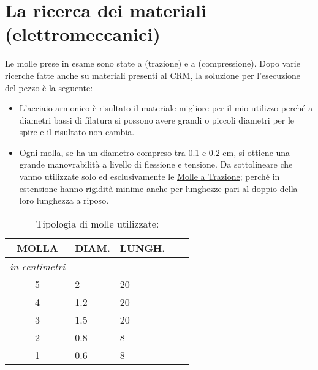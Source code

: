 
\chapter{La ricerca dei materiali (elettromeccanici)}
\label{chp:La ricerca dei materiali (elettromeccanici)}

Le molle prese in esame sono state a (trazione) e a (compressione).
Dopo varie ricerche fatte anche su materiali presenti al CRM, la soluzione per l'esecuzione del pezzo è la seguente:

\begin{itemize}
\item{L'acciaio armonico è risultato il materiale migliore per il mio utilizzo perché a diametri bassi di filatura si possono avere grandi o piccoli diametri per le spire e il risultato non cambia.}
\item{Ogni molla, se ha un diametro compreso tra 0.1 e 0.2 cm, si ottiene una grande manovrabilità a livello di flessione e tensione. Da sottolineare che vanno utilizzate solo ed esclusivamente le \underline {Molle a Trazione}; perché in estensione hanno rigidità minime anche per lunghezze pari al doppio della loro lunghezza a riposo.}
\end{itemize}

\begin{table}[htp]
\caption{Tipologia di molle utilizzate:}
\begin{center}

\begin{tabular}{cp{2cm}p{2cm}p{.2cm}p{2cm}} \textbf{MOLLA}&\textbf{DIAM.}&\textbf{LUNGH.}\\
\hline \textit{in centimetri} \\
\hline 5&2&20\\
\hline 4&1.2&20\\
\hline 3&1.5&20\\
\hline 2&0.8&8\\
\hline 1&0.6&8\\
\end{tabular}

\end{center}
\label{tab:molle}
\end{table}%



